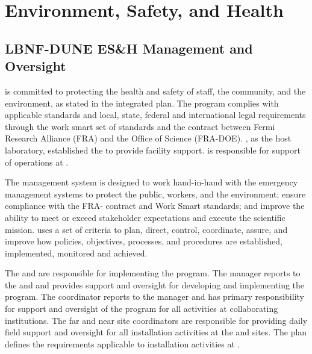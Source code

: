 \section{Environment, Safety, and Health}
\label{sec:es-tc-eshq}

\subsection{LBNF-DUNE ES\&H Management and Oversight}
\label{sec:es-tc-eshq-prog}

 is committed to protecting the health and
safety of staff, the community, and the environment, as stated in the
 integrated  plan.  
The   program complies with applicable
standards and local, state, federal and international legal
requirements through the \fnal work smart set of standards and the
contract between Fermi Research Alliance (FRA) and the 
Office of Science (FRA-DOE). \fnal, as the host laboratory,
established the  to provide facility support.
 is responsible for support of 
operations at .


The   management system is
designed to work hand-in-hand with the  emergency
management systems to protect the public, workers, and the environment;
ensure compliance with the FRA- contract and \fnal Work Smart
standards; and improve the  ability to meet or
exceed stakeholder expectations and execute the
scientific mission.   uses a set of criteria to plan, direct,
control, coordinate, assure, and improve how  policies,
objectives, processes, and procedures are established, implemented,
monitored and achieved.




The  and  are responsible for
implementing the   program.  The
  manager reports  to the
 and  and provides
 support and oversight for developing and implementing the
  program. The  
coordinator reports to the  
manager and has primary responsibility for  support and
oversight of the   program for all activities
at collaborating institutions. %
The far and near site  coordinators are responsible for providing 
daily field support and
oversight for all installation activities at the 
and  sites. 
The   plan defines the 
requirements applicable to installation activities at . 

